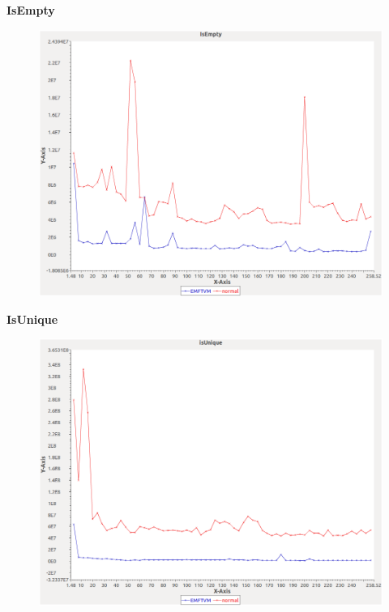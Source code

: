 \noindent\textbf{IsEmpty}

\begin{figure}[h]
\centering
\includegraphics[width=\textwidth]{graphs/bag/IsEmpty}
\end{figure}
\pagebreak

\noindent\textbf{IsUnique}

\begin{figure}[h]
\centering
\includegraphics[width=\textwidth]{graphs/bag/isUnique}
\end{figure}
\pagebreak

